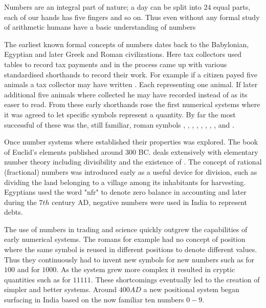 


Numbers are an integral part of nature; a day can be split into $24$ equal parts, each of our hands has five fingers and so on. Thus even without any formal study of arithmetic humans have a basic understanding of numbers

\myindent The earliest known formal concepts of numbers dates back to the Babylonian, Egyptian and later Greek and Roman civilizations. Here tax collectors used tables to record tax payments and in the process came up with various standardised shorthands to record their work. For example if a citizen payed five animals a tax collector may have written . Each  representing one animal. If later additional five animals where collected he may have recorded  instead of  as its easer to read. From these early shorthands rose the first numerical systems where it was agreed to let specific symbols represent a quantity. By far the most successful of these was the, still familiar, roman symbols , , , , , , , ,  and . 

\myindent Once number systems where established their properties was explored. The  book of Euclid's elements published around 300 BC. deals extensively with elementary number theory including divisibility and the existence of . The concept of rational (fractional) numbers was introduced early as a useful device for division, such as dividing the land belonging to a village among its inhabitants for harvesting. Egyptians used the word "nfr" to denote zero balance in accounting and later during the $7th$ century AD, negative numbers were used in India to represent debts.

\myindent The use of numbers in trading and science quickly outgrew the capabilities of early numerical systems. The romans for example had no concept of position where the same symbol is reused in different positions to denote different values. Thus they continuously had to invent new symbols for new numbers such as  for $100$ and  for $1000$. As the system grew more complex it resulted in cryptic quantities such as  for $11111$. These shortcomings eventually led to the creation of simpler and better systems. Around $400 AD$ a new positional system began surfacing in India based on the now familiar ten numbers $0-9$. 

